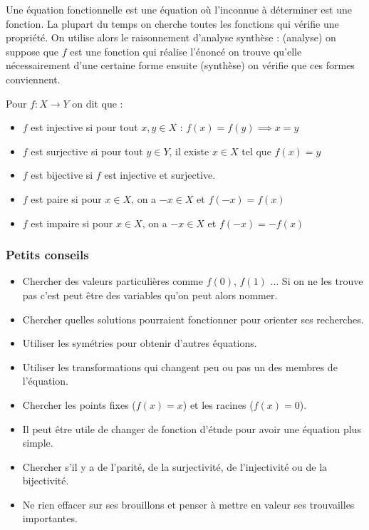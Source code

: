 \begin{rappel}
Une équation fonctionnelle est une équation où l'inconnue à déterminer est une fonction. La plupart du temps on cherche toutes les fonctions qui vérifie une propriété. On utilise alors le raisonnement d'analyse synthèse : (analyse) on suppose que $f$ est une fonction qui réalise l'énoncé on trouve qu'elle nécessairement d'une certaine forme ensuite (synthèse) on vérifie que ces formes conviennent.
\end{rappel}
\begin{rappel}
Pour $f:X\to Y$ on dit que :
\begin{itemize}
    \item $f$ est injective si pour tout $x,y\in X$ : $f(x)=f(y)\implies x=y$
    \item $f$ est surjective si pour tout $y\in Y$, il existe $x\in X$ tel que $f(x)=y$
    \item $f$ est bijective si $f$ est injective et surjective.
    \item $f$ est paire si pour $x\in X$, on a $-x\in X$ et $f(-x)=f(x)$
    \item $f$ est impaire si pour $x\in X$, on a $-x\in X$ et $f(-x)=-f(x)$
\end{itemize}
\end{rappel}
\subsubsection{Petits conseils}
\begin{itemize}
    \item Chercher des valeurs particulières comme $f(0)$, $f(1)$ ... Si on ne les trouve pas c'est peut être des variables qu'on peut alors nommer.
    \item Chercher quelles solutions pourraient fonctionner pour orienter ses recherches.
    \item Utiliser les symétries pour obtenir d'autres équations.
    \item Utiliser les transformations qui changent peu ou pas un des membres de l'équation.
    \item Chercher les points fixes ($f(x)=x$) et les racines ($f(x)=0$).
    \item Il peut être utile de changer de fonction d'étude pour avoir une équation plus simple.
    \item Chercher s'il y a de l'parité, de la surjectivité, de l'injectivité ou de la bijectivité.
    \item Ne rien effacer sur ses brouillons et penser à mettre en valeur ses trouvailles importantes.
\end{itemize}

